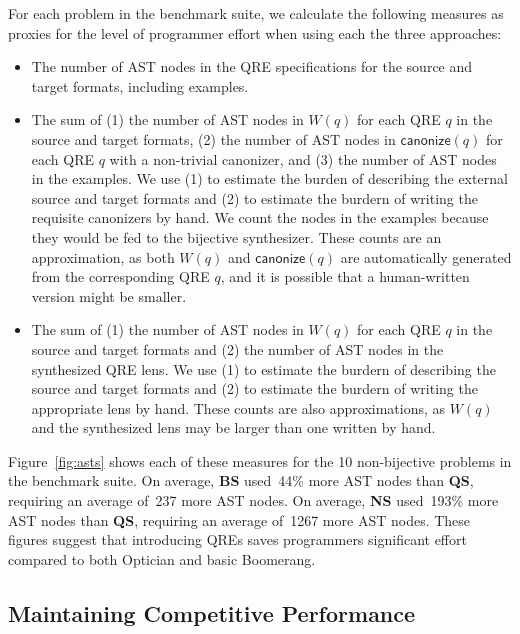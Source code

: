 \documentclass[acmsmall,review,anonymous]{acmart}
\newcommand{\codefont}[1]{\ensuremath{\mathsf{#1}}}
\newcommand{\kw}[1]{\codefont{#1}}
\newcommand{\canonize}{\ensuremath{\kw{canonize}}}
\newcommand{\QRESize}{\textbf{QS}}
\newcommand{\canonizeAndSpecSize}{\textbf{BS}}
\newcommand{\LensAndSpecSize}{\textbf{NS}}
\begin{document}
For each problem in the benchmark suite, we calculate the following
measures as proxies for the level of programmer effort when using each
the three approaches:

%
\begin{itemize}
  \item[\QRESize{}:] 
  The number of AST nodes in the QRE specifications for the source and
  target formats, including examples. 
  \item[\canonizeAndSpecSize{}:] 
  The sum of (1) the number of AST nodes in $W(q)$ for each QRE $q$ in the source and target
  formats, (2) the number of AST nodes in $\canonize(q)$ for each QRE $q$ with a
  non-trivial canonizer, and (3) the number of AST nodes in the
  examples.  We use (1) to estimate the burden of describing
  the external source and target formats and (2) to estimate the
  burdern of writing the requisite canonizers
  by hand.  We count the nodes in the examples because they would be
  fed to the bijective synthesizer.  
  These counts are an approximation, as both $W(q)$ and $\canonize(q)$ are
  automatically generated from the corresponding QRE $q$, and it is
  possible that a human-written version might be smaller.
  \item[\LensAndSpecSize{}:] The sum of (1) the number of AST nodes in
  $W(q)$ for each QRE $q$ in the source and target formats and (2) the
  number of AST nodes in the synthesized QRE lens.  We use (1) to
  estimate the burdern of describing the source and target formats
  and (2) to estimate the burdern of writing the appropriate lens by
  hand. These counts are also approximations, as
  $W(q)$ and the synthesized lens may be larger than one written by hand.
\end{itemize}

Figure~\ref{fig:asts} shows each of these measures for the 10
non-bijective problems in the benchmark suite.  On
average, \canonizeAndSpecSize{} used~44\% more AST nodes
than \QRESize{}, requiring an average of~237 more AST nodes. On 
average, \LensAndSpecSize{} used~193\% more AST nodes than \QRESize{}, requiring an
average of~1267 more AST nodes. These figures suggest that introducing QREs saves
programmers significant effort compared to both Optician and basic
Boomerang.

\subsection{Maintaining Competitive Performance}
\end{document}
